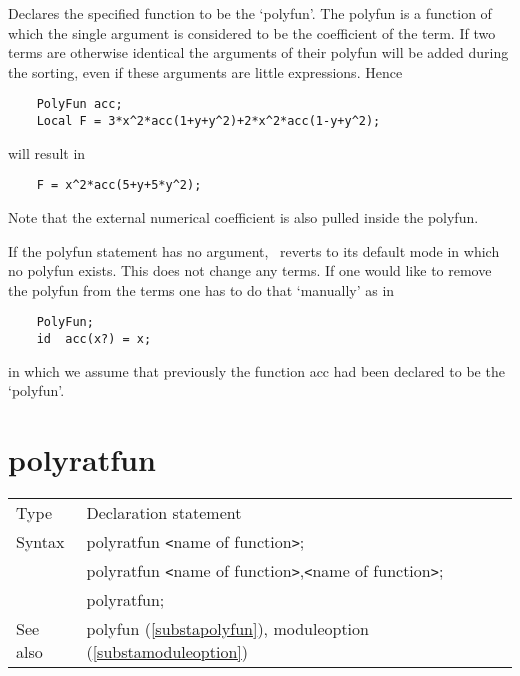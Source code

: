 \noindent Declares the specified function to be the 
`polyfun'. The polyfun is a function of which the single 
argument is considered to be the 
coefficient of the term. If two terms are otherwise 
identical the arguments of their polyfun will be added during the sorting, 
even if these arguments are little expressions. Hence
\begin{verbatim}
    PolyFun acc;
    Local F = 3*x^2*acc(1+y+y^2)+2*x^2*acc(1-y+y^2);
\end{verbatim}
will result in
\begin{verbatim}
    F = x^2*acc(5+y+5*y^2);
\end{verbatim}
Note that the external numerical coefficient is also 
pulled inside the polyfun.

\noindent If the polyfun statement has no argument, \FORM\ reverts to its 
default mode in which no polyfun exists. This does not change any terms. If 
one would like to remove the polyfun from the terms one has to do that 
`manually' as in
\begin{verbatim}
    PolyFun;
    id  acc(x?) = x;
\end{verbatim}
in which we assume that previously the function acc had been declared to be 
the `polyfun'. \vspace{10mm}


\section{polyratfun}
\label{substapolyratfun}

\noindent \begin{tabular}{ll}
Type & Declaration statement\\
Syntax & polyratfun {\tt<}name of function{\tt>}; \\
       & polyratfun {\tt<}name of function{\tt>},{\tt<}name of function{\tt>}; \\
       & polyratfun;
\\ See also & polyfun (\ref{substapolyfun}),
			  moduleoption (\ref{substamoduleoption})
\end{tabular}\vspace{4mm}

